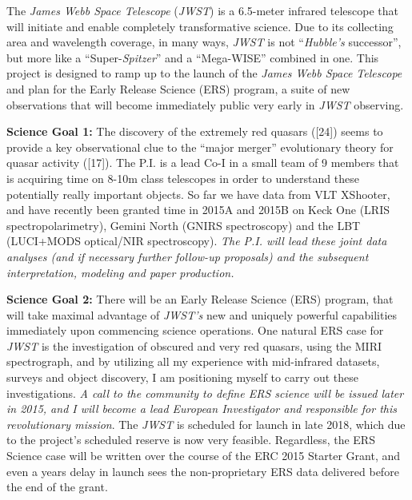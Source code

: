 \documentclass[oneside, a4paper, onecolumn, 11pt]{article}
\begin{document}
\smallskip
\noindent
The {\it James Webb Space Telescope} ({\it JWST}) is a 6.5-meter
infrared telescope that will initiate and enable completely
transformative science. Due to its collecting area and wavelength
coverage, in many ways, {\it JWST} is not ``{\it Hubble's}
successor'', but more like a ``Super-{\it Spitzer}'' and a
``Mega-WISE'' combined in one.  This project is designed to ramp up to
the launch of the {\it James Webb Space Telescope} and plan for the Early
Release Science (ERS) program, a suite of new observations that will
become immediately public very early in {\it JWST} observing.

\smallskip
\smallskip
\noindent 
{\bf Science Goal 1:}
The discovery of the extremely red quasars ([24]) seems to provide a
key observational clue to the ``major merger'' evolutionary theory for
quasar activity ([17]). 
The P.I. is a lead Co-I in a small team of 9 members that is 
acquiring time on 8-10m class telescopes in order to understand these
potentially really important objects. So far we have data from VLT XShooter, 
and have recently been granted time in 2015A and 2015B on Keck
One (LRIS spectropolarimetry), Gemini North (GNIRS spectroscopy) and
the LBT (LUCI+MODS optical/NIR spectroscopy).
{\it The P.I. will lead these joint data analyses (and if necessary further follow-up proposals) 
and the subsequent interpretation, modeling and paper production. }


\smallskip
\smallskip
\noindent
{\bf Science Goal 2:}
There will be an Early Release Science (ERS) program, that will take
maximal advantage of {\it JWST's} new and uniquely powerful
capabilities immediately upon commencing science operations. 
One natural ERS case for {\it JWST} is the
investigation of obscured and very red quasars, using the MIRI
spectrograph, and by utilizing all my experience with mid-infrared
datasets, surveys and object discovery, I am positioning myself to
carry out these investigations.  
{\it A call to the community to define ERS science will be issued later in 
2015, and I will become a lead European Investigator and responsible for this
revolutionary mission}.  
The {\it JWST} is scheduled for
launch in late 2018, which due to the project's scheduled reserve is
now very feasible.  Regardless, the ERS Science case will be written
over the course of the ERC 2015 Starter Grant, and even a years delay
in launch sees the non-proprietary ERS data delivered before the end
of the grant.

\end{document}
